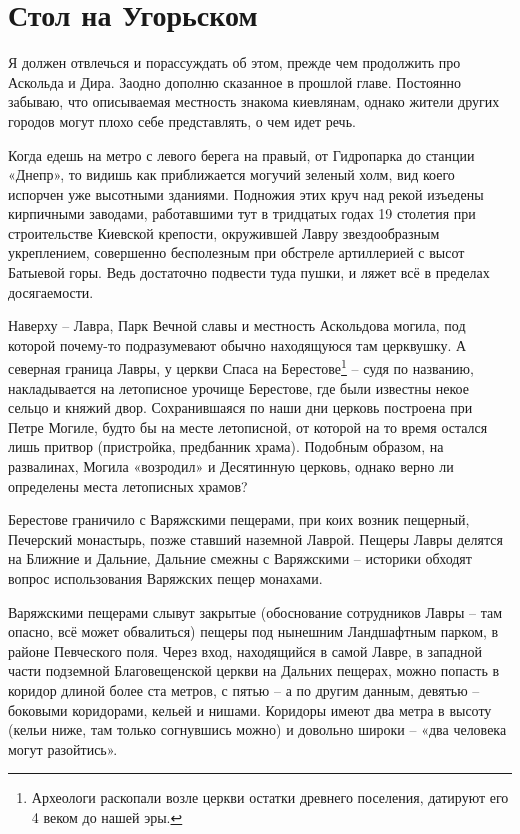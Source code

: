 \chapter{Стол на Угорьском}

Я должен отвлечься и порассуждать об этом, прежде чем продолжить про Аскольда и Дира. Заодно дополню сказанное в прошлой главе. Постоянно забываю, что описываемая местность знакома киевлянам, однако жители других городов могут плохо себе представлять, о чем идет речь.

Когда едешь на метро с левого берега на правый, от Гидропарка до станции «Днепр», то видишь как приближается могучий зеленый холм, вид коего испорчен уже высотными зданиями. Подножия этих круч над рекой изъедены кирпичными заводами, работавшими тут в тридцатых годах 19 столетия при строительстве Киевской крепости, окружившей Лавру звездообразным укреплением, совершенно бесполезным при обстреле артиллерией с высот Батыевой горы. Ведь достаточно подвести туда пушки, и ляжет всё в пределах досягаемости.

Наверху – Лавра, Парк Вечной славы и местность Аскольдова могила, под которой почему-то подразумевают обычно находящуюся там церквушку. А северная граница Лавры, у церкви Спаса на Берестове\footnote{Археологи раскопали возле церкви остатки древнего поселения, датируют его 4 веком до нашей эры.} – судя по названию, накладывается на летописное урочище Берестове, где были известны некое сельцо и княжий двор. Сохранившаяся по наши дни церковь построена при Петре Могиле, будто бы на месте летописной, от которой на то время остался лишь притвор (пристройка, предбанник храма). Подобным образом, на развалинах, Могила «возродил» и Десятинную церковь, однако верно ли определены места летописных храмов?

Берестове граничило с Варяжскими пещерами, при коих возник пещерный, Печерский монастырь, позже ставший наземной Лаврой. Пещеры Лавры делятся на Ближние и Дальние, Дальние смежны с Варяжскими – историки обходят вопрос использования Варяжских пещер монахами.

Варяжскими пещерами слывут закрытые (обоснование сотрудников Лавры – там опасно, всё может обвалиться) пещеры под нынешним Ландшафтным парком, в районе Певческого поля. Через вход, находящийся в самой Лавре, в западной части подземной Благовещенской церкви на Дальних пещерах, можно попасть в коридор длиной более ста метров, с пятью – а по другим данным, девятью – боковыми коридорами, кельей и нишами. Коридоры имеют два метра в высоту (кельи ниже, там только согнувшись можно) и довольно широки – «два человека могут разойтись».

